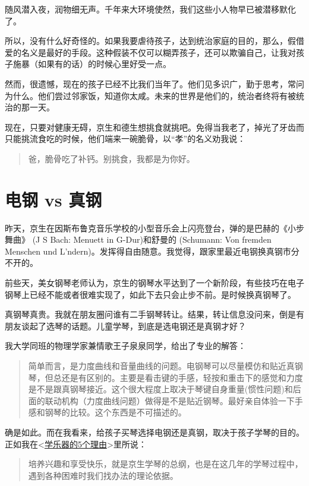\documentclass[twoside,openright,headings=optiontohead]{ctexbook} %
\begin{document}
{随风潜入夜，润物细无声。千年来大环境使然，我们这些小人物早已被潜移默化了。

所以，没有什么好奇怪的。如果我要虐待孩子，达到统治家庭的目的，那么，假借爱的名义是最好的手段。这种假装不仅可以糊弄孩子，还可以欺骗自己，让我对孩子施暴（如果有的话）的时候心里好受一点。

然而，很遗憾，现在的孩子已经不比我们当年了。他们见多识广，勤于思考，常问为什么。他们尝过邻家饭，知道你太咸。未来的世界是他们的，统治者终将有被统治的那一天。

现在，只要对健康无碍，京生和德生想挑食就挑吧。免得当我老了，掉光了牙齿而只能挑流食吃的时候，他们端来一碗脆骨，以``孝''的名义劝我说：

\begin{quote}
爸，脆骨吃了补钙。别挑食，我都是为你好。
\end{quote}

\chapter*{电钢 vs 真钢}\label{epiano}

昨天，京生在因斯布鲁克音乐学校的小型音乐会上闪亮登台，弹的是巴赫的《小步舞曲》
(J S Bach: Menuett in G-Dur)和舒曼的 (Schumann: Von fremden Menschen und
L'ndern)。发挥得自由随意。我觉得，跟家里最近电钢换真钢市分不开的。

前些天，美女钢琴老师认为，京生的钢琴水平达到了一个新阶段，有些技巧在电子钢琴上已经不能或者很难实现了，如此下去只会止步不前。是时候换真钢琴了。

真钢琴真贵。我就在朋友圈问谁有二手钢琴转让。结果，转让信息没问来，倒是有朋友谈起了选琴的话题。儿童学琴，到底是选电钢还是真钢才好？

我大学同班的物理学家兼情歌王子泉泉同学，给出了专业的解答：

\begin{quote}
简单而言，是力度曲线和音量曲线的问题。电钢琴可以尽量模仿和贴近真钢琴，但总还是有区别的。主要是看击键的手感，轻按和重击下的感觉和力度是不是跟真钢琴接近。这个很大程度上取决于琴键自身重量(惯性问题)和后面的联动机构（力度曲线问题）做得是不是贴近钢琴。最好亲自体验一下手感和钢琴的比较。这个东西是不可描述的。
\end{quote}

确是如此。而在我看来，给孩子买琴选择电钢还是真钢，取决于孩子学琴的目的。正如我在\textless{}\href{http://dapengde.com/archives/18929}{学乐器的5个理由}\textgreater{}里所说：

\begin{quote}
培养兴趣和享受快乐，就是京生学琴的总纲，也是在这几年的学琴过程中，遇到各种困难时我们找办法的理论依据。
\end{quote}

}
\end{document}
